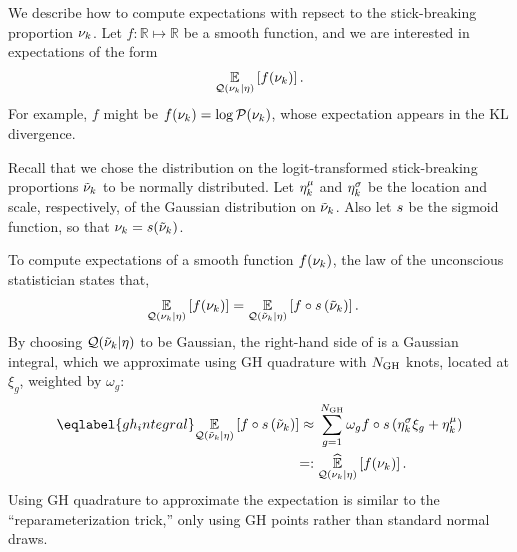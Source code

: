 We describe how to compute expectations with repsect to the stick-breaking
proportion $\nu_k$. Let $f: \mathbb{R}\mapsto\mathbb{R}$ be a smooth function,
and we are interested in expectations of the form
\begin{align*}
  \underset{\mathcal{Q}(\nu_{k} \vert \eta)}{\mathbb{E}}\left[f(\nu_{k})\right].
\end{align*}
For example, $f$ might be $f(\nu_k) = \log \mathcal{P}(\nu_k)$, whose
expectation appears in the $\mathrm{KL}$ divergence.

Recall that we chose the distribution on the logit-transformed
stick-breaking proportions $\tilde{\nu}_k$ to be normally distributed.
Let $\eta^{\mu}_k$ and $\eta^{\sigma}_k$ be the location and scale, respectively,
of the Gaussian distribution on $\tilde{\nu}_k$.
Also let $s$ be the sigmoid function, so that $\nu_k = s(\tilde{\nu}_k)$.

To compute expectations of a smooth function
$f(\nu_{k})$, the law of the unconscious statistician states that,
\begin{align*}
  \underset{\mathcal{Q}(\nu_{k} \vert \eta)}{\mathbb{E}}\left[f(\nu_{k})\right] ={}&
  \underset{\mathcal{Q}(\tilde{\nu}_k \vert \eta)}{\mathbb{E}}\left[f\circ s\left(\tilde{\nu}_k\right)\right].
\end{align*}
By choosing $\mathcal{Q}(\tilde{\nu}_k \vert \eta)$ to be Gaussian,
the right-hand side of is a Gaussian integral,
which we approximate
using GH quadrature with $N_{\mathrm{GH}}$ knots,
located at $\xi_g$, weighted by $\omega_g$:
%
\begin{align}\eqlabel{gh_integral}
%
\expect{\q(\lnu_\k \vert \eta)}
       {f\circ \s\left(\lnu_\k\right)}
\approx{}&
    \sum_{g=1}^{\ngh} \omega_g f\circ \s \left(\lnusd_\k \xi_{g} + \lnumean_\k\right)
 \nonumber\\=:{}&
\expecthat{\q(\nuk \vert \eta)}{f(\nuk)}.
%
\end{align}
%
Using GH quadrature to approximate the expectation
is similar to the ``reparameterization trick,'' only using
GH points rather than standard normal draws.
